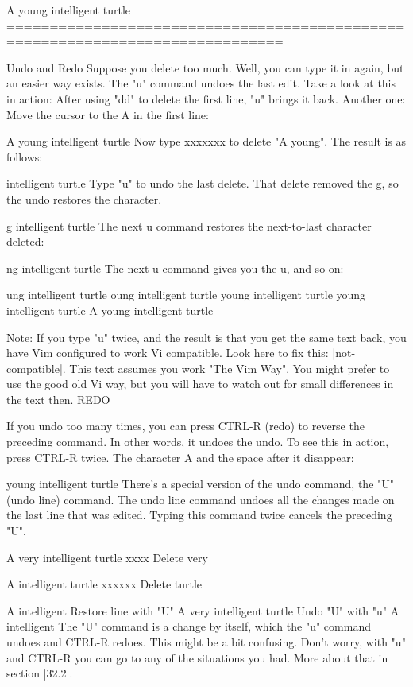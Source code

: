 A young intelligent turtle
==============================================================================

Undo and Redo
Suppose you delete too much. Well, you can type it in again, but an easier way exists. The "u" command undoes the last edit. Take a look at this in action: After using "dd" to delete the first line, "u" brings it back. Another one: Move the cursor to the A in the first line:

A young intelligent turtle
Now type xxxxxxx to delete "A young". The result is as follows:

 intelligent turtle
Type "u" to undo the last delete. That delete removed the g, so the undo restores the character.

g intelligent turtle
The next u command restores the next-to-last character deleted:

ng intelligent turtle
The next u command gives you the u, and so on:

ung intelligent turtle
oung intelligent turtle
young intelligent turtle
 young intelligent turtle
A young intelligent turtle

Note:
If you type "u" twice, and the result is that you get the same text
back, you have Vim configured to work Vi compatible.  Look here to fix
this: |not-compatible|.
   This text assumes you work "The Vim Way".  You might prefer to use
the good old Vi way, but you will have to watch out for small
differences in the text then.
REDO

If you undo too many times, you can press CTRL-R (redo) to reverse the preceding command. In other words, it undoes the undo. To see this in action, press CTRL-R twice. The character A and the space after it disappear:

young intelligent turtle
There's a special version of the undo command, the "U" (undo line) command. The undo line command undoes all the changes made on the last line that was edited. Typing this command twice cancels the preceding "U".

A very intelligent turtle
  xxxx              Delete very

A intelligent turtle
          xxxxxx        Delete turtle

A intelligent
                Restore line with "U"
A very intelligent turtle
                Undo "U" with "u"
A intelligent
The "U" command is a change by itself, which the "u" command undoes and CTRL-R redoes. This might be a bit confusing. Don't worry, with "u" and CTRL-R you can go to any of the situations you had. More about that in section |32.2|.

